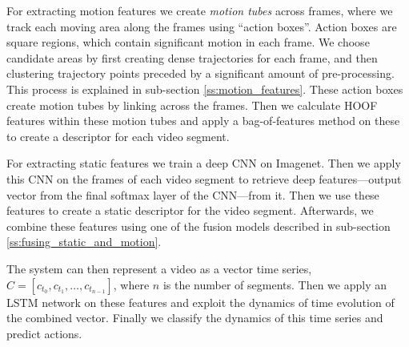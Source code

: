 For extracting motion features we create \textit{motion tubes} across frames, where we track each moving area along the frames using ``action boxes''.
Action boxes are square regions, which contain significant motion in each frame. We choose candidate areas by first creating dense trajectories for each frame,
and then clustering trajectory points preceded by a significant amount of pre-processing. This process is explained in sub-section \ref{ss:motion_features}.
These action boxes create motion tubes by linking across the frames. Then we calculate HOOF~\cite{chaudhry2009histograms} features within these motion tubes and apply a
bag-of-features method on these to create a descriptor for each video segment.

For extracting static features we train a deep CNN on Imagenet. Then we apply this CNN
on the frames of each video segment to retrieve deep features---output vector from the final softmax layer of the CNN---from it. Then we use these features
to create a static descriptor for the video segment. Afterwards, we combine these features using one of the fusion models described in sub-section \ref{ss:fusing_static_and_motion}.

The system can then represent a video as a vector time series, $C = [c_{t_0}, c_{t_1}, \dots, c_{t_{n-1}}]$,
where $n$ is the number of segments. Then we apply an LSTM network on these features and exploit the dynamics of time evolution of the combined vector.
Finally we classify the dynamics of this time series and predict actions.



